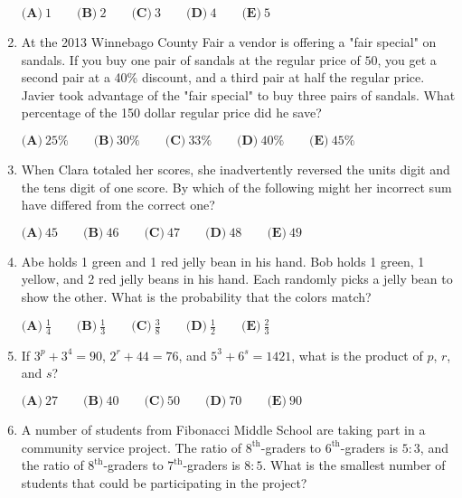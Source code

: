 \documentclass{article}
\begin{document}
\begin{enumerate}[label=\arabic*., itemsep=0.5em]
\(\textbf{(A)}\ 1 \qquad \textbf{(B)}\ 2 \qquad \textbf{(C)}\ 3 \qquad \textbf{(D)}\ 4 \qquad \textbf{(E)}\ 5\)\par \vspace{0.5em}\item At the 2013 Winnebago County Fair a vendor is offering a "fair special" on sandals. If you buy one pair of sandals at the regular price of \(50\), you get a second pair at a 40\% discount, and a third pair at half the regular price. Javier took advantage of the "fair special" to buy three pairs of sandals. What percentage of the 150 dollar regular price did he save?

\(\textbf{(A)}\ 25\% \qquad \textbf{(B)}\ 30\% \qquad \textbf{(C)}\ 33\% \qquad \textbf{(D)}\ 40\% \qquad \textbf{(E)}\ 45\%\)\par \vspace{0.5em}\item When Clara totaled her scores, she inadvertently reversed the units digit and the tens digit of one score. By which of the following might her incorrect sum have differed from the correct one?

\(\textbf{(A)}\ 45 \qquad \textbf{(B)}\ 46 \qquad \textbf{(C)}\ 47 \qquad \textbf{(D)}\ 48 \qquad \textbf{(E)}\ 49\)\par \vspace{0.5em}\item Abe holds 1 green and 1 red jelly bean in his hand. Bob holds 1 green, 1 yellow, and 2 red jelly beans in his hand. Each randomly picks a jelly bean to show the other. What is the probability that the colors match?

\(\textbf{(A)}\ \frac14 \qquad \textbf{(B)}\ \frac13 \qquad \textbf{(C)}\ \frac38 \qquad \textbf{(D)}\ \frac12 \qquad \textbf{(E)}\ \frac23\)\par \vspace{0.5em}\item If \(3^p + 3^4 = 90\), \(2^r + 44 = 76\), and \(5^3 + 6^s = 1421\), what is the product of \(p\), \(r\), and \(s\)?

\(\textbf{(A)}\ 27 \qquad \textbf{(B)}\ 40 \qquad \textbf{(C)}\ 50 \qquad \textbf{(D)}\ 70 \qquad \textbf{(E)}\ 90\)\par \vspace{0.5em}\item A number of students from Fibonacci Middle School are taking part in a community service project. The ratio of \(8^\text{th}\)-graders to \(6^\text{th}\)-graders is \(5:3\), and the ratio of \(8^\text{th}\)-graders to \(7^\text{th}\)-graders is \(8:5\). What is the smallest number of students that could be participating in the project?


\end{enumerate}
\end{document}
